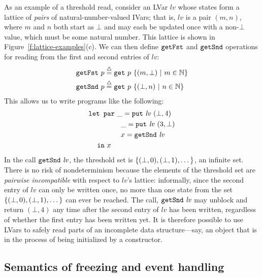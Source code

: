 \documentclass{article}
\begin{document}
As an example of a threshold read, consider an LVar $\mathit{lv}$
whose states form a lattice of \emph{pairs} of natural-number-valued
IVars; that is, $\mathit{lv}$ is a pair $(m, n)$, where $m$ and $n$
both start as $\bot$ and may each be updated once with a non-$\bot$
value, which must be some natural number.  This lattice is shown in
Figure~\ref{f:lattice-examples}(c).  We can then define $\mbox{\texttt{getFst}}$ and
$\mbox{\texttt{getSnd}}$ operations for reading from the first and second entries of
$\mathit{lv}$:
\begin{align*}
\mbox{\texttt{getFst}}~p & \stackrel{\triangle}{=} \mbox{\texttt{get}}~p~\lbrace (m, \bot) \ | \  m \in
    \mathbb{N} \rbrace \\
\mbox{\texttt{getSnd}}~p & \stackrel{\triangle}{=} \mbox{\texttt{get}}~p~\lbrace (\bot, n) \ | \  n \in
    \mathbb{N} \rbrace
\end{align*}
This allows us to write programs like the following:
\begin{equation*}
\begin{split}
& \mbox{\texttt{\mbox{\texttt{let}}~\mbox{\texttt{par}}}} ~\_ = \mbox{\texttt{put}}~\mathit{lv}~(\bot, 4) \\
&  \hspace{4.2em} ~\_ = \mbox{\texttt{put}}~\mathit{lv}~(3, \bot) \\
&  \hspace{4.2em} ~x = \mbox{\texttt{getSnd}}~\mathit{lv} \\
&  \hspace{1.2em} \mbox{\texttt{in}}~x
\end{split}
\label{e:lvar-example-4}
\end{equation*}
In the call $\mbox{\texttt{getSnd}}~\mathit{lv}$, the threshold set is
$\left\{(\bot, 0), (\bot, 1), \dots\right\}$, an infinite set.  There is no
risk of nondeterminism because the elements of the threshold set are
\emph{pairwise incompatible} with respect to $\mathit{lv}$'s lattice:
informally, since the second entry of $\mathit{lv}$ can only be
written once, no more than one state from the set $\left\{(\bot, 0),
  (\bot, 1), \dots\right\}$ can ever be reached.  The call,
$\mbox{\texttt{getSnd}}~\mathit{lv}$ may unblock and return $(\bot, 4)$ any time
after the second entry of $\mathit{lv}$ has been written, regardless
of whether the first entry has been written yet.  It is therefore
possible to use LVars to safely read parts of an incomplete data
structure---say, an object that is in the process of being initialized
by a constructor.

\subsection{Semantics of freezing and event handling}
\end{document}
